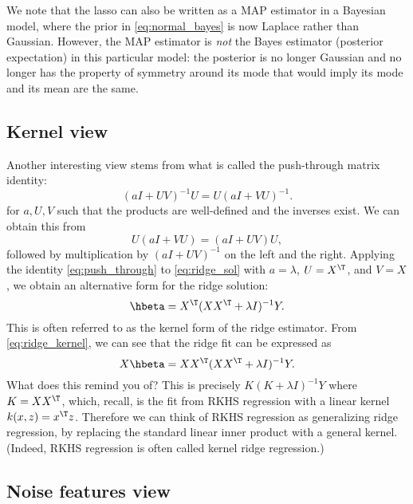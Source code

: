 \documentclass{article}
\begin{document}
We note that the lasso can also be written as a MAP estimator in a Bayesian 
model, where the prior in \eqref{eq:normal_bayes} is now Laplace rather than  
Gaussian. However, the MAP estimator is \emph{not} the Bayes estimator
(posterior expectation) in this particular model: the posterior is no longer
Gaussian and no longer has the property of symmetry around its mode that would
imply its mode and its mean are the same.   

\subsection{Kernel view}

Another interesting view stems from what is called the push-through matrix
identity:
\begin{equation}
\label{eq:push_through}
(aI + UV)^{-1} U = U (aI + VU)^{-1}.
\end{equation}
for $a,U,V$ such that the products are well-defined and the inverses exist. We
can obtain this from
\[
U (aI + VU) = (aI + UV) U,
\]
followed by multiplication by $(aI + UV)^{-1}$ on the left and the right. 
Applying the identity \eqref{eq:push_through} to \eqref{eq:ridge_sol} with
$a=\lambda$, $U=X^\T$, and $V=X$, we obtain an alternative form for the ridge
solution:  
\begin{equation}
\label{eq:ridge_kernel}
\hbeta = X^\T (XX^\T + \lambda I)^{-1} Y.
\end{equation}
This is often referred to as the kernel form of the ridge estimator. From
\eqref{eq:ridge_kernel}, we can see that the ridge fit can be expressed as
\[
X\hbeta = XX^\T (XX^\T + \lambda I)^{-1} Y.
\]
What does this remind you of? This is precisely $K(K + \lambda I)^{-1} Y$ where
$K = XX^\T$, which, recall, is the fit from RKHS regression with a linear kernel 
$k(x,z) = x^\T z$. Therefore we can think of RKHS regression as generalizing
ridge regression, by replacing the standard linear inner product with a general
kernel. (Indeed, RKHS regression is often called kernel ridge regression.)

\subsection{Noise features view}

\def\asto{\overset{\mathrm{as}}{\to}}
\end{document}
